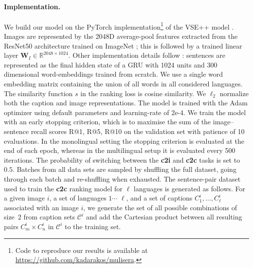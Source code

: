 \paragraph{Implementation.}
We build our model on the PyTorch implementation\footnote{Code to reproduce our results is available at\\ \url{https://github.com/kadarakos/mulisera}.}
of the VSE++ model \cite{faghri2017vse++}.
Images are represented by the 2048D average-pool features
extracted from the ResNet50 architecture \cite{he2016deep} trained on ImageNet \cite{deng2009imagenet}; this is followed by a trained linear layer
$\mathbf{W}_{I} \in \mathbb{R}^{2048 \times 1024}$. Other implementation details follow \cite{faghri2017vse++}: sentences are represented as the final hidden state of a GRU \cite{chung2014empirical} with 1024 units and 300 dimensional word-embeddings trained from scratch. We use a single word embedding matrix containing  the union of all words in all considered languages.
The similarity function $s$ in the ranking loss is cosine similarity. We $\ell_2$ normalize both the caption and
image representations. The model is trained
with the Adam optimizer \cite{kingma2014adam}
using default parameters and learning-rate of \mbox{2e-4}.
We train the model with an early stopping criterion, which is to maximise the
sum of the image--sentence recall scores R@1, R@5, R@10 on the validation set with patience of 10 evaluations.
In the monolingual setting the stopping criterion is evaluated at the end of each epoch, whereas in the multilingual setup it is evaluated every 500 iterations.
The probability of switching between the {\bf c2i} and {\bf c2c} tasks is set to $0.5$. Batches from all data sets are sampled by shuffling the full dataset, going through each batch and re-shuffling when exhausted.
The sentence-pair dataset used to train the {\bf c2c} ranking model for $\ell$ languages is generated as follows.
For a given image $i$, a set of languages $1 \cdots$ $\ell$, and a set of captions $C^i_1, \ldots, C^i_\ell$ associated with an image $i$, we generate the set of all possible combinations of size~2 from caption sets $\mathcal{C}^i$ and add the Cartesian product between all resulting pairs $C^i_m \times C^i_n$ in $\mathcal{C}^i$ to the training set.
